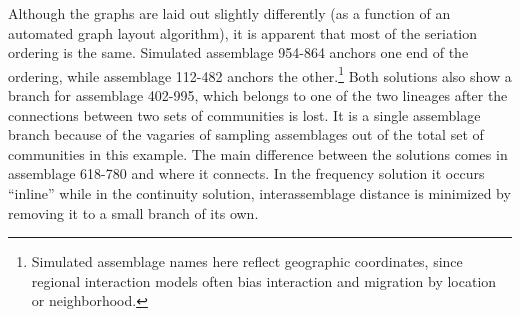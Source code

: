 \documentclass[graybox,natbib]{svmult}
\begin{document}
Although the graphs are laid out slightly differently (as a function of
an automated graph layout algorithm), it is apparent that most of the
seriation ordering is the same. Simulated assemblage 954-864 anchors one
end of the ordering, while assemblage 112-482 anchors the
other.\footnote{Simulated assemblage names here reflect geographic
  coordinates, since regional interaction models often bias interaction
  and migration by location or neighborhood.} Both solutions also show a
branch for assemblage 402-995, which belongs to one of the two lineages
after the connections between two sets of communities is lost. It is a
single assemblage branch because of the vagaries of sampling assemblages
out of the total set of communities in this example. The main difference
between the solutions comes in assemblage 618-780 and where it connects.
In the frequency solution it occurs ``inline'' while in the continuity
solution, interassemblage distance is minimized by removing it to a
small branch of its own.
\end{document}
